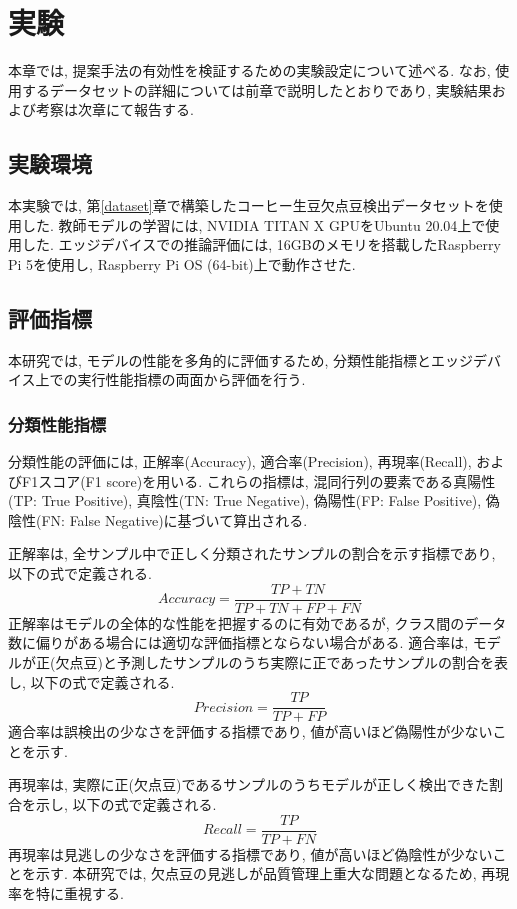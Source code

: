 \chapter{実験}\label{experiment}
本章では, 提案手法の有効性を検証するための実験設定について述べる.
なお, 使用するデータセットの詳細については前章で説明したとおりであり, 実験結果および考察は次章にて報告する.

\section{実験環境}
本実験では, 第\ref{dataset}章で構築したコーヒー生豆欠点豆検出データセットを使用した.
教師モデルの学習には, NVIDIA TITAN X GPUをUbuntu 20.04上で使用した.
エッジデバイスでの推論評価には, 16GBのメモリを搭載したRaspberry Pi 5を使用し, Raspberry Pi OS (64-bit)上で動作させた.

\section{評価指標}
本研究では, モデルの性能を多角的に評価するため, 分類性能指標とエッジデバイス上での実行性能指標の両面から評価を行う.

\subsection{分類性能指標}
分類性能の評価には, 正解率(Accuracy), 適合率(Precision), 再現率(Recall), およびF1スコア(F1 score)を用いる.
これらの指標は, 混同行列の要素である真陽性(TP: True Positive), 真陰性(TN: True Negative), 偽陽性(FP: False Positive), 偽陰性(FN: False Negative)に基づいて算出される.

正解率は, 全サンプル中で正しく分類されたサンプルの割合を示す指標であり, 以下の式で定義される.
\begin{equation}
\textit{Accuracy} = \frac{TP + TN}{TP + TN + FP + FN}
\end{equation}
正解率はモデルの全体的な性能を把握するのに有効であるが, クラス間のデータ数に偏りがある場合には適切な評価指標とならない場合がある.
適合率は, モデルが正(欠点豆)と予測したサンプルのうち実際に正であったサンプルの割合を表し, 以下の式で定義される.
\begin{equation}
\textit{Precision} = \frac{TP}{TP + FP}
\end{equation}
適合率は誤検出の少なさを評価する指標であり, 値が高いほど偽陽性が少ないことを示す.

再現率は, 実際に正(欠点豆)であるサンプルのうちモデルが正しく検出できた割合を示し, 以下の式で定義される.
\begin{equation}
\textit{Recall} = \frac{TP}{TP + FN}
\end{equation}
再現率は見逃しの少なさを評価する指標であり, 値が高いほど偽陰性が少ないことを示す.
本研究では, 欠点豆の見逃しが品質管理上重大な問題となるため, 再現率を特に重視する.

